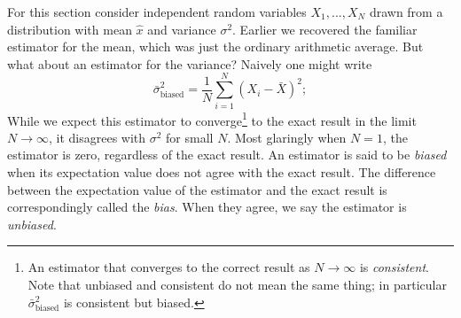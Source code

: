 For this section consider independent random variables $X_1,...,X_N$ 
drawn from a distribution with mean $\hat{x}$ and variance $\sigma^2$. 
Earlier we recovered the familiar estimator for the mean, which was
just the ordinary arithmetic average. But what about an estimator for 
the variance? Naively one might write
\begin{equation}\label{eq:bad}
  \bar{\sigma}^2_{\text{biased}}=\frac{1}{N}\sum_{i=1}^N(X_i-\bar{X})^2;
\end{equation} 
While we expect this estimator to converge\footnote{An estimator that
converges to the correct result as $N\to\infty$ is
{\it consistent}. Note that unbiased and consistent
do not mean the same thing; in particular $\bar{\sigma}^2_{\text{biased}}$
is consistent but biased.} to the
exact result in the limit $N\to\infty$, it disagrees with
$\sigma^2$ for small $N$. Most glaringly when $N=1$, the
estimator is zero, regardless of the exact result.
An estimator is said to be {\it biased} when its expectation value
does not agree with the exact result. The difference between the
expectation value of the estimator and the exact result is
correspondingly called the {\it bias}. When they agree, we say
the estimator is {\it unbiased}.
